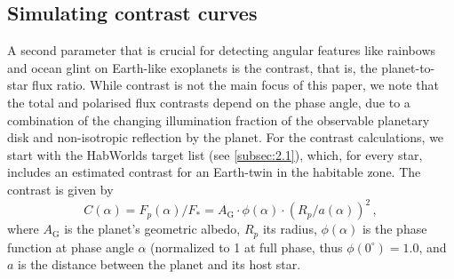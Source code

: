 \documentclass[usenatbib]{mnras}
\newcommand{\HWO}{HabWorlds\xspace}
\begin{document}
\subsection{Simulating contrast curves}
\label{subsec:2.4}

A second parameter that is crucial for detecting angular features like rainbows and ocean glint on Earth-like exoplanets is the contrast, that is, the planet-to-star flux ratio. 
%
While contrast is not the main focus of this paper, we note that the total and polarised flux contrasts depend on the phase angle, due to a combination of the changing illumination fraction of the observable planetary disk and non-isotropic reflection by the planet.
%
For the contrast calculations, we start with the \HWO target list (see \cref{subsec:2.1}), which, for every star, includes an estimated contrast for an Earth-twin in the habitable zone.
%
The contrast is given by \citep[e.g.,][]{2023A&A...671A.165M}
\begin{equation}
    C(\alpha) 
    = F_p(\alpha) / F_* 
    = A_\mathrm{G} \cdot \phi(\alpha) \cdot \left( R_p / a(\alpha) \right)^2 \,,
    \label{eq:contrast}
\end{equation}
where $A_\mathrm{G}$ is the planet's geometric albedo, $R_p$ its radius, $\phi(\alpha)$ is the phase function at phase angle $\alpha$ (normalized to \num{1} at full phase, thus $\phi(0^\circ)= 1.0$, and $a$ is the distance between the planet and its host star.
%
\end{document}
